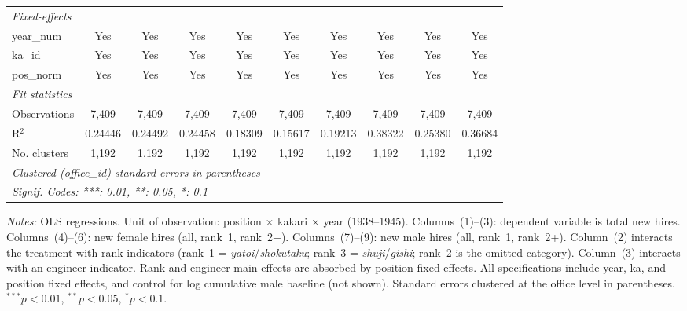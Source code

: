 \begin{table}[htbp]
\begin{threeparttable}
\begin{tabular}{lccccccccc}
   \midrule
   \emph{Fixed-effects}\\
   year\_num                      & Yes           & Yes             & Yes            & Yes      & Yes      & Yes           & Yes      & Yes           & Yes\\  
   ka\_id                         & Yes           & Yes             & Yes            & Yes      & Yes      & Yes           & Yes      & Yes           & Yes\\  
   pos\_norm                      & Yes           & Yes             & Yes            & Yes      & Yes      & Yes           & Yes      & Yes           & Yes\\  
   \midrule
   \emph{Fit statistics}\\
   Observations                   & 7,409         & 7,409           & 7,409          & 7,409    & 7,409    & 7,409         & 7,409    & 7,409         & 7,409\\  
   R$^2$                          & 0.24446       & 0.24492         & 0.24458        & 0.18309  & 0.15617  & 0.19213       & 0.38322  & 0.25380       & 0.36684\\  
   No. clusters & 1,192         & 1,192           & 1,192          & 1,192    & 1,192    & 1,192         & 1,192    & 1,192         & 1,192\\  
   \midrule \midrule
   \multicolumn{10}{l}{\emph{Clustered (office\_id) standard-errors in parentheses}}\\
   \multicolumn{10}{l}{\emph{Signif. Codes: ***: 0.01, **: 0.05, *: 0.1}}\\
\end{tabular}
\begin{tablenotes}[flushleft]
\footnotesize
\item \textit{Notes:} OLS regressions. Unit of observation: position $\times$ kakari $\times$ year (1938--1945). Columns~(1)--(3): dependent variable is total new hires. Columns~(4)--(6): new female hires (all, rank~1, rank~2+). Columns~(7)--(9): new male hires (all, rank~1, rank~2+). Column~(2) interacts the treatment with rank indicators (rank~1 = \emph{yatoi}/\emph{shokutaku}; rank~3 = \emph{shuji}/\emph{gishi}; rank~2 is the omitted category). Column~(3) interacts with an engineer indicator. Rank and engineer main effects are absorbed by position fixed effects. All specifications include year, ka, and position fixed effects, and control for log cumulative male baseline (not shown). Standard errors clustered at the office level in parentheses. $^{***}p<0.01$, $^{**}p<0.05$, $^{*}p<0.1$.
\end{tablenotes}
\end{threeparttable}
\end{table}
